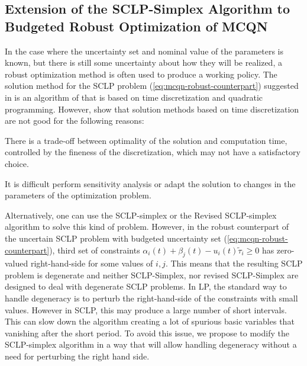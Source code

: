 \documentclass[11pt,a4paper,titlepage]{article}
\theoremstyle{definition}
\theoremstyle{plain}
\begin{document}
    \subsection{Extension of the SCLP-Simplex Algorithm to Budgeted Robust Optimization of MCQN}
    \label{subsec:topics:robust-sclp-extension}

    In the case where the uncertainty set and nominal value of the parameters is known,
    but there is still some uncertainty about how they will be realized,
    a robust optimization method is often used to produce a working policy.
    The solution method for the SCLP problem (\ref{eq:mcqn-robust-counterpart}) suggested in \autocite{bertsimas2014robust}
    is an algorithm of \autocite{luo1998new}
    that is based on time discretization and quadratic programming.
    However,
    \autocite{shindin2021application} show that solution methods based on time discretization are not good for the following reasons:
    \begin{compactitem}
        \item
        There is a trade-off between optimality of the solution and computation time,
        controlled by the fineness of the discretization,
        which may not have a satisfactory choice.
        \item
        It is difficult perform sensitivity analysis or adapt the solution to changes in the parameters of the optimization problem.
    \end{compactitem}
    Alternatively, one can use the SCLP-simplex \autocite{weiss2008simplex}
    or the Revised SCLP-simplex \autocite{shindin2021application}
    algorithm to solve this kind of problem.
    However,
    in the  robust  counterpart of the uncertain SCLP problem with budgeted uncertainty set (\ref{eq:mcqn-robust-counterpart}),
    third set of constraints $\alpha_{i}(t)+\beta_{j}(t)-u_{i}(t) \tilde{\tau}_{i} \geq 0$
    has zero-valued right-hand-side for some values of $i,j$.
    This means that the resulting SCLP problem is degenerate and neither SCLP-Simplex,
    nor revised SCLP-Simplex are designed to deal with degenerate SCLP problems.
    In LP,
    the standard way to handle degeneracy is to perturb the right-hand-side
    of the constraints with small values.
    However in SCLP, this may produce a large number of short intervals.
    This can slow down the algorithm creating a lot of spurious basic variables that vanishing after the short period.
    To avoid this issue,
    we propose to modify the SCLP-simplex algorithm in a way that will allow handling degeneracy without a need for perturbing the right hand side.
\end{document}
